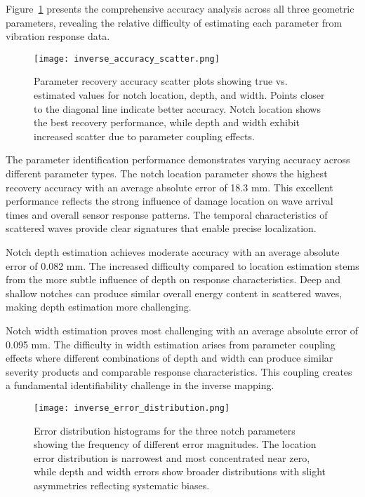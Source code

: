 \documentclass[12pt,a4paper]{report}
\begin{document}
Figure~\ref{fig:inverse_accuracy_scatter} presents the comprehensive accuracy analysis across all three geometric parameters, revealing the relative difficulty of estimating each parameter from vibration response data.

\begin{figure}[htbp]
\centering
\texttt{[image: inverse\_accuracy\_scatter.png]}
\caption{Parameter recovery accuracy scatter plots showing true vs. estimated values for notch location, depth, and width. Points closer to the diagonal line indicate better accuracy. Notch location shows the best recovery performance, while depth and width exhibit increased scatter due to parameter coupling effects.}
\label{fig:inverse_accuracy_scatter}
\end{figure}

The parameter identification performance demonstrates varying accuracy across different parameter types. The notch location parameter shows the highest recovery accuracy with an average absolute error of 18.3 mm. This excellent performance reflects the strong influence of damage location on wave arrival times and overall sensor response patterns. The temporal characteristics of scattered waves provide clear signatures that enable precise localization.

Notch depth estimation achieves moderate accuracy with an average absolute error of 0.082 mm. The increased difficulty compared to location estimation stems from the more subtle influence of depth on response characteristics. Deep and shallow notches can produce similar overall energy content in scattered waves, making depth estimation more challenging.

Notch width estimation proves most challenging with an average absolute error of 0.095 mm. The difficulty in width estimation arises from parameter coupling effects where different combinations of depth and width can produce similar severity products and comparable response characteristics. This coupling creates a fundamental identifiability challenge in the inverse mapping.

\begin{figure}[htbp]
\centering
\texttt{[image: inverse\_error\_distribution.png]}
\caption{Error distribution histograms for the three notch parameters showing the frequency of different error magnitudes. The location error distribution is narrowest and most concentrated near zero, while depth and width errors show broader distributions with slight asymmetries reflecting systematic biases.}
\label{fig:inverse_error_distribution}
\end{figure}
\end{document}

